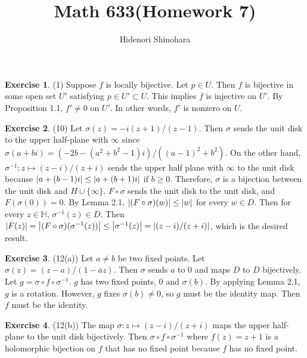 \documentclass[12pt, psamsfonts]{amsart}
\theoremstyle{definition}
\newtheorem*{exer}{Exercise}
\theoremstyle{remark}
\numberwithin{equation}{section}
\begin{document}
\title{Math 633(Homework 7)}
\author{Hidenori Shinohara}
\maketitle

\begin{exer}{(1)}
  Suppose $f$ is locally bijective.
  Let $p \in U$.
  Then $f$ is bijective in some open set $U'$ satisfying $p \in U' \subset U$.
  This implies $f$ is injective on $U'$.
  By Proposition 1.1, $f' \ne 0$ on $U'$.
  In other words, $f'$ is nonzero on $U$.

\end{exer}

\begin{exer}{(10)}
  Let $\sigma(z) = -i(z + 1) / (z - 1)$.
  Then $\sigma$ sends the unit disk to the upper half-plane with $\infty$ since
  $\sigma(a + bi) = (-2b - (a^2 + b^2 - 1)i) / ((a - 1)^2 + b^2)$.
  On the other hand, $\sigma^{-1}: z \mapsto (z - i) / (z + i)$ sends the upper half plane with $\infty$ to the unit disk because $\abs{a + (b - 1)i} \leq \abs{a + (b + 1)i}$ if $b \geq 0$.
  Therefore, $\sigma$ is a bijection between the unit disk and $H \cup \{ \infty \}$.
  $F \circ \sigma$ sends the unit disk to the unit disk, and $F(\sigma(0)) = 0$.
  By Lemma 2.1, $\abs{(F \circ \sigma)(w)} \leq \abs{w}$ for every $w \in D$.
  Then for every $z \in \mathbb{H}$, $\sigma^{-1}(z) \in D$.
  Then $\abs{F(z)} = \abs{(F \circ \sigma)(\sigma^{-1}(z))} \leq \abs{\sigma^{-1}(z)} = \abs{(z - i) / (z + i)}$, which is the desired result.
\end{exer}

\begin{exer}{(12(a))}
  Let $a \ne b$ be two fixed points.
  Let $\sigma(z) = (z - a) / (1 - \overline{a}z)$.
  Then $\sigma$ sends $a$ to $0$ and maps $D$ to $D$ bijectively.
  Let $g = \sigma \circ f \circ \sigma^{-1}$.
  $g$ has two fixed points, 0 and $\sigma(b)$.
  By applying Lemma 2.1, $g$ is a rotation.
  However, $g$ fixes $\sigma(b) \ne 0$, so $g$ must be the identity map.
  Then $f$ must be the identity.
\end{exer}

\begin{exer}{(12(b))}
  The map $\sigma: z \mapsto (z - i) / (z + i)$ maps the upper half-plane to the unit disk bijectively.
  Then $\sigma \circ f \circ \sigma^{-1}$ where $f(z) = z + 1$ is a holomorphic bijection on $f$ that has no fixed point because $f$ has no fixed point.
\end{exer}
\end{document}
